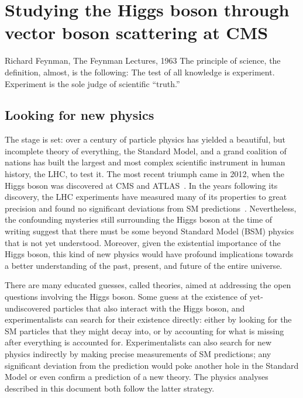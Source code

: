 \chapter{Studying the Higgs boson through vector boson scattering at CMS}
\begin{aquote}{Richard Feynman, The Feynman Lectures, 1963}
The principle of science, the definition, almost, is the following: The test of all knowledge is experiment. 
Experiment is the sole judge of scientific ``truth.''
\end{aquote}

\section{Looking for new physics}
The stage is set: over a century of particle physics has yielded a beautiful, but incomplete theory of everything, the Standard Model, and a grand coalition of nations has built the largest and most complex scientific instrument in human history, the LHC, to test it. 
The most recent triumph came in 2012, when the Higgs boson was discovered at CMS and ATLAS~\cite{CMSdisc, ATLASdisc}. 
In the years following its discovery, the LHC experiments have measured many of its properties to great precision and found no significant deviations from SM predictions~\cite{NatureHiggsCMS2022, NatureHiggsATLAS2022}. 
Nevertheless, the confounding mysteries still surrounding the Higgs boson at the time of writing suggest that there must be some beyond Standard Model (BSM) physics that is not yet understood. 
Moreover, given the existential importance of the Higgs boson, this kind of new physics would have profound implications towards a better understanding of the past, present, and future of the entire universe. 

There are many educated guesses, called theories, aimed at addressing the open questions involving the Higgs boson. 
Some guess at the existence of yet-undiscovered particles that also interact with the Higgs boson\footnotemark{}, and experimentalists can search for their existence directly: either by looking for the SM particles that they might decay into, or by accounting for what is missing after everything is accounted for. 
Experimentalists can also search for new physics indirectly by making precise measurements of SM predictions; any significant deviation from the prediction would poke another hole in the Standard Model or even confirm a prediction of a new theory. 
The physics analyses described in this document both follow the latter strategy.

